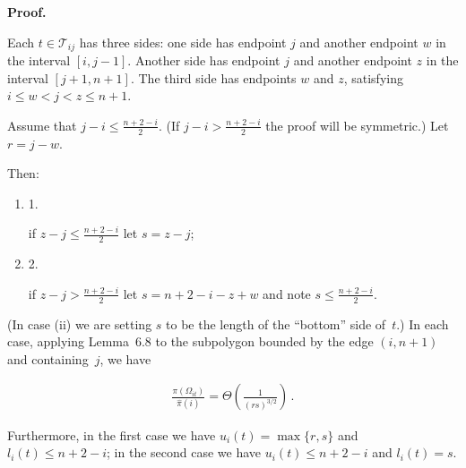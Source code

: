 \documentclass[10pt,a4paper]{article}
\begin{document}



\par\medskip\noindent\textbf{Proof.}\par



Each $t\in\mathcal{T}_{ij}$ has three sides: one side has endpoint $j$ and another endpoint $w$ in the interval $[i,j-1]$. Another side has endpoint $j$ and another endpoint $z$ in the interval $[j+1,n+1]$. The third side has endpoints $w$ and $z$, satisfying $i\leq w<j<z\leq n+1$.\par




Assume that $j-i\leq\frac{n+2-i}{2}$. (If $j-i>\frac{n+2-i}{2}$ the proof will be symmetric.) Let $r=j-w$.\par




Then:\par


\begin{enumerate}


\item[] 1. 


if $z-j\leq\frac{n+2-i}{2}$ let $s=z-j$;\par




\item[] 2. 


if $z-j>\frac{n+2-i}{2}$ let $s=n+2-i-z+w$ and note $s\leq\frac{n+2-i}{2}$.\par




\end{enumerate}


(In case (ii) we are setting $s$ to be the length of the “bottom” side of $t$.)
In each case, applying Lemma 6.8 to the subpolygon bounded by the edge $(i,n+1)$ and containing $j$, we have\par




\[\begin{gathered}
\frac{\pi(\Omega_{it})}{\hat{\pi}(i)}=\Theta\left(\frac{1}{(rs)^{3/2}}\right)\,.
\end{gathered}\]




Furthermore, in the first case we have $u_{i}(t)=\max\{r,s\}$ and $l_{i}(t)\leq n+2-i$; in the second case we have $u_{i}(t)\leq n+2-i$ and $l_{i}(t)=s$.\par
\end{document}
